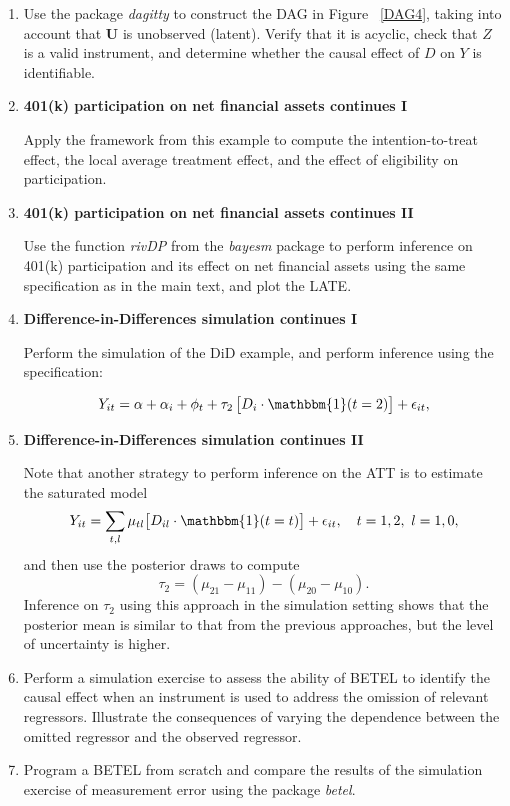 \begin{enumerate}
	\item Use the package \textit{dagitty} to construct the DAG in Figure~	\ref{DAG4}, taking into account that $\mathbf{U}$ is unobserved (latent). Verify that it is acyclic, check that $Z$ is a valid instrument, and determine whether the causal effect of \(D\) on \(Y\) is identifiable.
	
	\item \textbf{401(k) participation on net financial assets continues I}  
	
	Apply the framework from this example to compute the intention-to-treat effect, the local average treatment effect, and the effect of eligibility on participation.
	
	\item \textbf{401(k) participation on net financial assets continues II} 
	
	Use the function \textit{rivDP} from the \textit{bayesm} package to perform inference on 401(k) participation and its effect on net financial assets using the same specification as in the main text, and plot the LATE.
	
	\item \textbf{Difference-in-Differences simulation continues I}
	
	Perform the simulation of the DiD example, and perform inference using the specification:
	
	\[
	Y_{it} = \alpha + \alpha_i + \phi_t + \tau_2 \,\big[ D_i \cdot \mathbbm{1}(t = 2) \big] + \epsilon_{it},
	\]
	
	\item \textbf{Difference-in-Differences simulation continues II}
	
	Note that another strategy to perform inference on the ATT is to estimate the saturated model
	\[
	Y_{it} = \sum_{t,l} \mu_{tl} \big[ D_{il} \cdot \mathbbm{1}(t = t) \big] + \epsilon_{it}, \quad t = 1, 2, \ l = 1, 0,
	\]
	and then use the posterior draws to compute
	\[
	\tau_2 = (\mu_{21} - \mu_{11}) - (\mu_{20} - \mu_{10}).
	\]
	Inference on $\tau_2$ using this approach in the simulation setting shows that the posterior mean is similar to that from the previous approaches, but the level of uncertainty is higher.
	
	\item Perform a simulation exercise to assess the ability of BETEL to identify the causal effect when an instrument is used to address the omission of relevant regressors. Illustrate the consequences of varying the dependence between the omitted regressor and the observed regressor.
	
	
	\item Program a BETEL from scratch and compare the results of the simulation exercise of measurement error using the package \textit{betel}.
	
	
	  
	 
	
	
\end{enumerate}
